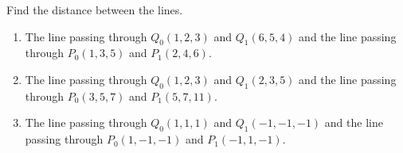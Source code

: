 Find the distance between the lines.

\begin{enumerate}
\item \label{problemDistanceLineLine(1,2,3)(6,5,4)to(1,3,5)(2,4,6)} The line passing through $Q_0(1,2,3) $ and $Q_1(6,5,4)$ and the line passing through $P_0(1,3,5)$ and $P_1(2,4,6)$.
\item The line passing through $Q_0(1,2,3) $ and $Q_1(2,3,5)$ and the line passing through $P_0(3,5,7)$ and $P_1(5,7,11)$.

\item The line passing through $ Q_0(1,1,1)$ and $Q_1(-1,-1,-1)$ and the line passing through $P_0(1, -1, -1)$ and $P_1(-1,1,-1)$.
\end{enumerate}

\begin{comment}Calculator code solving above problem:
p0:=(3,5,7);
p1:=(5,7,11);
q0:=(1,2,3); 
q1:=(2,3,-5);
u1:=p1-p0;
u2:=q1-q0;
r:=q0-p0;
n:=u1\times u2;
((r n^t)_1)_1 /\sqrt{}(((n n^t)_1)_1) 
\end{comment}